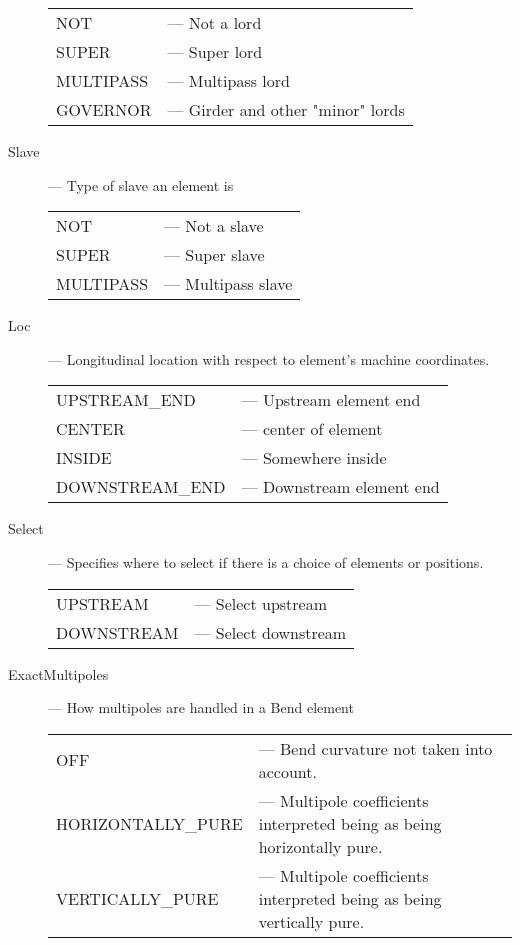 \begin{description}
\hspace*{-20pt}
\begin{tabular}{ll}
  NOT       & --- Not a lord \\
  SUPER     & --- Super lord \\
  MULTIPASS & --- Multipass lord \\
  GOVERNOR  & --- Girder and other "minor" lords \\ 
\end{tabular}
%
\item[Slave] --- Type of slave an element is \Newline
\hspace*{-20pt}
\begin{tabular}{ll}
  NOT       & --- Not a slave \\
  SUPER     & --- Super slave \\
  MULTIPASS & --- Multipass slave \\
\end{tabular}
%
\item[Loc] --- Longitudinal location with respect to element's machine coordinates. \Newline
\hspace*{-20pt}
\begin{tabular}{ll}
  UPSTREAM_END   & --- Upstream element end\\
  CENTER         & --- center of element \\
  INSIDE         & --- Somewhere inside \\
  DOWNSTREAM_END & --- Downstream element end \\
\end{tabular}
%
\item[Select] --- Specifies where to select if there is a choice of elements or positions. \Newline
\hspace*{-20pt}
\begin{tabular}{ll}
  UPSTREAM   & --- Select upstream \\
  DOWNSTREAM & --- Select downstream \\
\end{tabular}
%
\item[ExactMultipoles] --- How multipoles are handled in a Bend element \Newline
\hspace*{-20pt}
\begin{tabular}{ll}
  OFF               & --- Bend curvature not taken into account. \\
  HORIZONTALLY_PURE & --- Multipole coefficients interpreted being as being horizontally pure. \\
  VERTICALLY_PURE   & --- Multipole coefficients interpreted being as being vertically pure. \\

\end{tabular}
\end{description}
